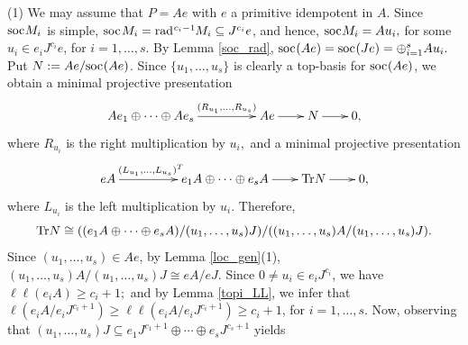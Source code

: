 \documentclass[10pt]{amsart}
\theoremstyle{definition}
\newcommand{\rad}{{\rm rad}\hspace{.5pt}}
\newcommand{\soc}{{\rm soc}\hspace{.5pt}}
\newcommand{\vp}{\vspace{.5pt}}
\begin{document}
 \vspace{-2pt}
 
 (1) We may assume that $P=Ae$ with $e$ a primitive idempotent in $A$. Since $\soc M_i$ is simple, $\soc \hspace{.5pt} M_i=\rad^{c_i-1} \hspace{-.5pt} M_i\subseteq J^{c_i}e$, and hence, $\soc M_i=Au_i,$ for some $u_i \in e_i J^{c_i} e$, for $i=1, \ldots, s$. By Lemma \ref{soc_rad},  $\soc(Ae)=\soc(Je)=\oplus_{i=1}^s Au_i.$ Put $N:=Ae/\soc(Ae)$. Since $\{u_1, \ldots, u_s\}$ is clearly a top-basis for $\soc(Ae)$, we obtain a minimal projective presentation \vspace{-6pt}
$$\xymatrixcolsep{20pt}\xymatrix{Ae_1 \oplus\cdots \oplus Ae_s \ar[rr]^-{(R_{u_1}, \ldots, R_{u_s})} && Ae \ar[r] & N \ar[r] & 0,}\vspace{-2.5pt}$$ where $R_{u_i}$ is the right multiplication by $u_i,$ and a minimal projective presentation \vspace{-6pt}
$$\xymatrixcolsep{20pt}\xymatrix{eA \ar[rr]^-{(L_{u_1}, \ldots, L_{u_s})^T\hspace{-4pt}} && e_1A \oplus\cdots \oplus e_sA \ar[r] & {\rm Tr}N \ar[r]& 0,}\vspace{-3pt}$$ where $L_{u_i}$ is the left multiplication by $u_i$. 
Therefore, \vspace{-2pt}
$${\rm Tr}N \cong ((e_1A \oplus\cdots \oplus e_sA)/(u_1, \ldots, u_s)J)/((u_1, \ldots, u_s)A/(u_1, \ldots, u_s)J).\vspace{-4pt}$$
Since $(u_1,\ldots,u_s)\in Ae$, by Lemma \ref{loc_gen}(1), $(u_1,\ldots,u_s)A / (u_1,\ldots,u_s)J \cong eA/eJ.$ Since $0\ne u_i\in e_iJ^{c_i}$, we have $\ell\ell(e_iA)\ge c_i+1;$ and by Lemma \ref{topi_LL}, we infer that $\ell(e_iA/e_iJ^{c_i+1}) \ge \ell\ell(e_iA/e_iJ^{c_i+1})\ge c_i+1$, for $i=1, \dots, s.$ \vp Now, observing that $(u_1, \ldots, u_s)J\subseteq e_1J^{c_1+1} \oplus \cdots \oplus e_s J^{c_s+1}$ yields \vspace{-2.5pt}
\end{document}
